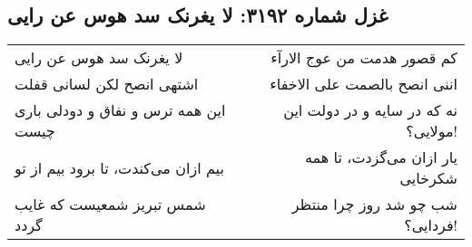 \begin{center}
\section*{غزل شماره ۳۱۹۲: لا یغرنک سد هوس عن رایی}
\label{sec:3192}
\begin{longtable}{l p{0.5cm} r}
لا یغرنک سد هوس عن رایی
&&
کم قصور هدمت من عوج الارآء
\\
اشتهی انصح لکن لسانی قفلت
&&
اننی انصح بالصمت علی الاخفاء
\\
این همه ترس و نفاق و دودلی باری چیست
&&
نه که در سایه و در دولت این مولایی؟!
\\
بیم ازان می‌کندت، تا برود بیم از تو
&&
یار ازان می‌گزدت، تا همه شکرخایی
\\
شمس تبریز شمعیست که غایب گردد
&&
شب چو شد روز چرا منتظر فردایی؟!
\\
\end{longtable}
\end{center}
